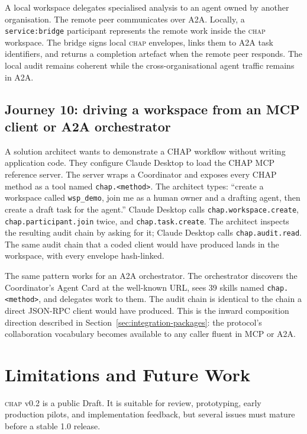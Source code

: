 \documentclass[11pt]{article}
\newcommand{\chap}{\textsc{chap}}
\begin{document}
A local workspace delegates specialised analysis to an agent owned by another organisation. The remote peer communicates over A2A. Locally, a \texttt{service:bridge} participant represents the remote work inside the \chap{} workspace. The bridge signs local \chap{} envelopes, links them to A2A task identifiers, and returns a completion artefact when the remote peer responds. The local audit remains coherent while the cross-organisational agent traffic remains in A2A.

\subsection{Journey 10: driving a workspace from an MCP client or A2A orchestrator}

A solution architect wants to demonstrate a CHAP workflow without writing application code. They configure Claude Desktop to load the CHAP MCP reference server. The server wraps a Coordinator and exposes every CHAP method as a tool named \texttt{chap.<method>}. The architect types: ``create a workspace called \texttt{wsp\_demo}, join me as a human owner and a drafting agent, then create a draft task for the agent.'' Claude Desktop calls \texttt{chap.workspace.create}, \texttt{chap.participant.join} twice, and \texttt{chap.task.create}. The architect inspects the resulting audit chain by asking for it; Claude Desktop calls \texttt{chap.audit.read}. The same audit chain that a coded client would have produced lands in the workspace, with every envelope hash-linked.

The same pattern works for an A2A orchestrator. The orchestrator discovers the Coordinator's Agent Card at the well-known URL, sees 39 skills named \texttt{chap.<method>}, and delegates work to them. The audit chain is identical to the chain a direct JSON-RPC client would have produced. This is the inward composition direction described in Section~\ref{sec:integration-packages}: the protocol's collaboration vocabulary becomes available to any caller fluent in MCP or A2A.

\section{Limitations and Future Work}
\label{sec:limitations}

\chap{} v0.2 is a public Draft. It is suitable for review, prototyping, early production pilots, and implementation feedback, but several issues must mature before a stable 1.0 release.
\end{document}
